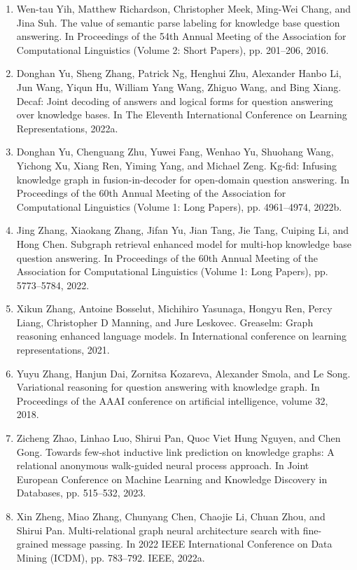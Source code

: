 \documentclass[11pt,UTF8,fontset=fandol]{ctexart}
\begin{document}
\begin{enumerate}[leftmargin=2em]
\item Wen-tau Yih, Matthew Richardson, Christopher Meek, Ming-Wei Chang, and Jina Suh. The value of semantic parse labeling for knowledge base question answering. In Proceedings of the 54th Annual Meeting of the Association for Computational Linguistics (Volume 2: Short Papers), pp. 201--206, 2016.
\item Donghan Yu, Sheng Zhang, Patrick Ng, Henghui Zhu, Alexander Hanbo Li, Jun Wang, Yiqun Hu, William Yang Wang, Zhiguo Wang, and Bing Xiang. Decaf: Joint decoding of answers and logical forms for question answering over knowledge bases. In The Eleventh International Conference on Learning Representations, 2022a.
\item Donghan Yu, Chenguang Zhu, Yuwei Fang, Wenhao Yu, Shuohang Wang, Yichong Xu, Xiang Ren, Yiming Yang, and Michael Zeng. Kg-fid: Infusing knowledge graph in fusion-in-decoder for open-domain question answering. In Proceedings of the 60th Annual Meeting of the Association for Computational Linguistics (Volume 1: Long Papers), pp. 4961--4974, 2022b.
\item Jing Zhang, Xiaokang Zhang, Jifan Yu, Jian Tang, Jie Tang, Cuiping Li, and Hong Chen. Subgraph retrieval enhanced model for multi-hop knowledge base question answering. In Proceedings of the 60th Annual Meeting of the Association for Computational Linguistics (Volume 1: Long Papers), pp. 5773--5784, 2022.
\item Xikun Zhang, Antoine Bosselut, Michihiro Yasunaga, Hongyu Ren, Percy Liang, Christopher D Manning, and Jure Leskovec. Greaselm: Graph reasoning enhanced language models. In International conference on learning representations, 2021.
\item Yuyu Zhang, Hanjun Dai, Zornitsa Kozareva, Alexander Smola, and Le Song. Variational reasoning for question answering with knowledge graph. In Proceedings of the AAAI conference on artificial intelligence, volume 32, 2018.
\item Zicheng Zhao, Linhao Luo, Shirui Pan, Quoc Viet Hung Nguyen, and Chen Gong. Towards few-shot inductive link prediction on knowledge graphs: A relational anonymous walk-guided neural process approach. In Joint European Conference on Machine Learning and Knowledge Discovery in Databases, pp. 515--532, 2023.
\item Xin Zheng, Miao Zhang, Chunyang Chen, Chaojie Li, Chuan Zhou, and Shirui Pan. Multi-relational graph neural architecture search with fine-grained message passing. In 2022 IEEE International Conference on Data Mining (ICDM), pp. 783--792. IEEE, 2022a.

\end{enumerate}
\end{document}
